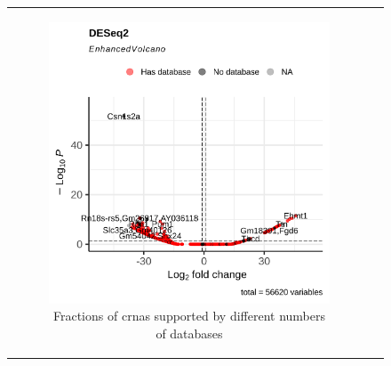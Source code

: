 \begin{figure}[ht] \begin{tabular}{cc}
        \begin{subfigure}{0.5\textwidth} \centering

            \includegraphics[width=\linewidth]{chapters/4_results_and_discussion/figures/dea/deseq2/tamoxifen/volcano.png}
            \caption{Fractions of \glspl{crna} supported by
                different numbers of databases}
            \label{fig:tamoxifen_volcano_deseq2}
        \end{subfigure}
        \begin{subfigure}{0.5\textwidth}
            \centering


\end{subfigure}
\end{tabular}
\end{figure}
